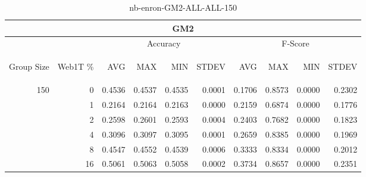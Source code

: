 \begin{center}
\begin{table}[htbp]
\begin{tabular}{ | r | r | r | r | r | r | r | r | r | r |}
\hline
\multicolumn{10}{|c|}{GM2}\\
\hline
 & & \multicolumn{4}{|c|}{Accuracy} & \multicolumn{4}{|c|}{F-Score}\\ \cline{3-10}
\begin{sideways}Group Size\end{sideways} & \begin{sideways}Web1T \%\end{sideways} & \begin{sideways}AVG\end{sideways} & \begin{sideways}MAX\end{sideways} & \begin{sideways}MIN\end{sideways} & \begin{sideways}STDEV\end{sideways} & \begin{sideways}AVG\end{sideways} & \begin{sideways}MAX\end{sideways} & \begin{sideways}MIN\end{sideways} & \begin{sideways}STDEV\end{sideways}\\
\hline
\multirow{6}{*}{150}
 & 0 & 0.4536 & 0.4537 & 0.4535 & 0.0001 & 0.1706 & 0.8573 & 0.0000 & 0.2302\\ \cline{2-10}
 & 1 & 0.2164 & 0.2164 & 0.2163 & 0.0000 & 0.2159 & 0.6874 & 0.0000 & 0.1776\\ \cline{2-10}
 & 2 & 0.2598 & 0.2601 & 0.2593 & 0.0004 & 0.2403 & 0.7682 & 0.0000 & 0.1823\\ \cline{2-10}
 & 4 & 0.3096 & 0.3097 & 0.3095 & 0.0001 & 0.2659 & 0.8385 & 0.0000 & 0.1969\\ \cline{2-10}
 & 8 & 0.4547 & 0.4552 & 0.4539 & 0.0006 & 0.3333 & 0.8334 & 0.0000 & 0.2012\\ \cline{2-10}
 & 16 & 0.5061 & 0.5063 & 0.5058 & 0.0002 & 0.3734 & 0.8657 & 0.0000 & 0.2351\\ \cline{2-10}
\hline
\end{tabular}
\caption{nb-enron-GM2-ALL-ALL-150}
\end{table}
\end{center}

